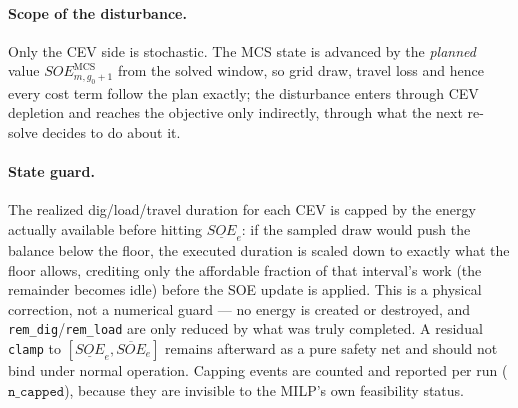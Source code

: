 \documentclass[11pt]{article}
\begin{document}
\paragraph{Scope of the disturbance.} Only the CEV side is stochastic. The MCS state is advanced
by the \emph{planned} value $SOE^{\text{MCS}}_{m,g_0+1}$ from the solved window, so grid draw,
travel loss and hence every cost term follow the plan exactly; the disturbance enters through CEV
depletion and reaches the objective only indirectly, through what the next re-solve decides to do
about it.

\paragraph{State guard.} The realized dig/load/travel duration for each CEV is capped by the
energy actually available before hitting $\underline{SOE}_e$: if the sampled draw would push the
balance below the floor, the executed duration is scaled down to exactly what the floor allows,
crediting only the affordable fraction of that interval's work (the remainder becomes idle) before
the SOE update is applied. This is a physical correction, not a numerical guard — no energy is
created or destroyed, and \texttt{rem\_dig}/\texttt{rem\_load} are only reduced by what was truly
completed. A residual \texttt{clamp} to $[\underline{SOE}_e,\overline{SOE}_e]$ remains afterward as
a pure safety net and should not bind under normal operation. Capping events are counted and
reported per run ($\texttt{n\_capped}$), because they are invisible to the MILP's own feasibility
status.
\end{document}
